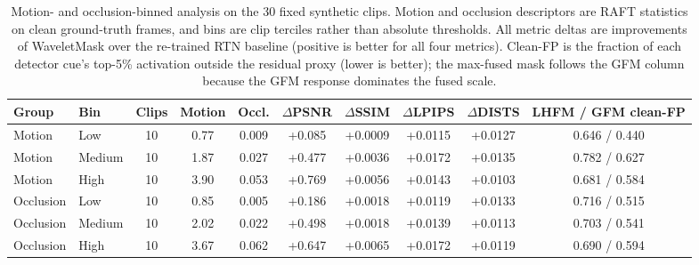 {\begin{table}[H]
\caption{Motion- and occlusion-binned analysis on the 30 fixed synthetic clips. Motion and occlusion descriptors are RAFT statistics on clean ground-truth frames, and bins are clip terciles rather than absolute thresholds. All metric deltas are improvements of WaveletMask over the re-trained RTN baseline (positive is better for all four metrics). Clean-FP is the fraction of each detector cue's top-5\% activation outside the residual proxy (lower is better); the max-fused mask follows the GFM column because the GFM response dominates the fused scale.\label{tab:motion_binning}}
\footnotesize
\begin{tabularx}{\textwidth}{llCCCCCCCC}
\toprule
\textbf{Group} & \textbf{Bin} & \textbf{Clips} & \textbf{Motion} & \textbf{Occl.} & \textbf{$\Delta$PSNR} & \textbf{$\Delta$SSIM} & \textbf{$\Delta$LPIPS} & \textbf{$\Delta$DISTS} & \textbf{LHFM / GFM clean-FP} \\
\midrule
Motion & Low    & 10 & 0.77 & 0.009 & +0.085 & +0.0009 & +0.0115 & +0.0127 & 0.646 / 0.440 \\
Motion & Medium & 10 & 1.87 & 0.027 & +0.477 & +0.0036 & +0.0172 & +0.0135 & 0.782 / 0.627 \\
Motion & High   & 10 & 3.90 & 0.053 & +0.769 & +0.0056 & +0.0143 & +0.0103 & 0.681 / 0.584 \\
\midrule
Occlusion & Low    & 10 & 0.85 & 0.005 & +0.186 & +0.0018 & +0.0119 & +0.0133 & 0.716 / 0.515 \\
Occlusion & Medium & 10 & 2.02 & 0.022 & +0.498 & +0.0018 & +0.0139 & +0.0113 & 0.703 / 0.541 \\
Occlusion & High   & 10 & 3.67 & 0.062 & +0.647 & +0.0065 & +0.0172 & +0.0119 & 0.690 / 0.594 \\
\bottomrule
\end{tabularx}
\normalsize
\end{table}

}
